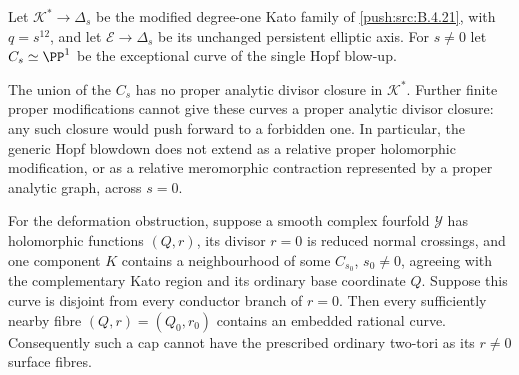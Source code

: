 \begin{proposition}\hypertarget{tag-030S}{}\label{push:src:B.4.23}

Let $\mathcal K^*\to\Delta_s$ be the modified degree-one
Kato family of \ref{push:src:B.4.21}, with $q=s^{12}$, and let
$\mathcal E\to\Delta_s$ be its unchanged persistent elliptic
axis. For $s\ne0$ let $C_s\simeq\PP^1$ be the exceptional
curve of the single Hopf blow-up.

The union of the $C_s$ has no proper analytic divisor
closure in $\mathcal K^*$. Further finite proper modifications
cannot give these curves a proper analytic divisor closure:
any such closure would push forward to a forbidden one.
In particular, the generic Hopf blowdown does not extend
as a relative proper holomorphic modification, or as a
relative meromorphic contraction represented by a proper
analytic graph, across $s=0$.

For the deformation obstruction, suppose a smooth complex
fourfold $\mathcal Y$ has holomorphic functions $(Q,r)$,
its divisor $r=0$ is reduced normal crossings, and one
component $K$ contains a neighbourhood of some $C_{s_0}$,
$s_0\ne0$, agreeing with the complementary Kato region
and its ordinary base coordinate $Q$. Suppose this curve
is disjoint from every conductor branch of $r=0$.
Then every sufficiently nearby fibre $(Q,r)=(Q_0,r_0)$
contains an embedded rational curve. Consequently such a
cap cannot have the prescribed ordinary two-tori as its
$r\ne0$ surface fibres.
\end{proposition}


